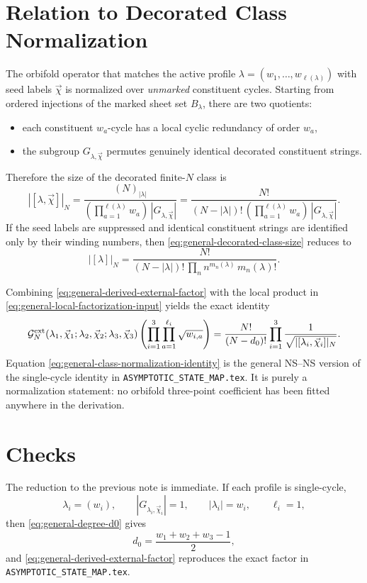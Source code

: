 \documentclass[11pt]{article}
\newcommand{\mc}[1]{\mathcal{#1}}
\begin{document}
\section{Relation to Decorated Class Normalization}
The orbifold operator that matches the active profile $\lambda=(w_1,\dots,w_{\ell(\lambda)})$ with seed labels $\vec\chi$ is normalized over \emph{unmarked} constituent cycles. Starting from ordered injections of the marked sheet set $B_\lambda$, there are two quotients:
\begin{itemize}
\item each constituent $w_a$-cycle has a local cyclic redundancy of order $w_a$,
\item the subgroup $G_{\lambda,\vec\chi}$ permutes genuinely identical decorated constituent strings.
\end{itemize}
Therefore the size of the decorated finite-$N$ class is
\begin{equation}\label{eq:general-decorated-class-size}
|[\lambda,\vec\chi]|_N
=
\frac{(N)_{|\lambda|}}{
\left(\prod_{a=1}^{\ell(\lambda)} w_a\right)\,
|G_{\lambda,\vec\chi}|
}
=
\frac{N!}{
(N-|\lambda|)!\,
\left(\prod_{a=1}^{\ell(\lambda)} w_a\right)\,
|G_{\lambda,\vec\chi}|
}.
\end{equation}
If the seed labels are suppressed and identical constituent strings are identified only by their winding numbers, then \eqref{eq:general-decorated-class-size} reduces to
\begin{equation}\label{eq:general-undecorated-class-size}
|[\lambda]|_N
=
\frac{N!}{
(N-|\lambda|)!\,
\prod_n n^{m_n(\lambda)}\,m_n(\lambda)!
}.
\end{equation}

Combining \eqref{eq:general-derived-external-factor} with the local product in \eqref{eq:general-local-factorization-input} yields the exact identity
\begin{equation}\label{eq:general-class-normalization-identity}
\mc G_N^{\rm ext}(\lambda_1,\vec\chi_1;\lambda_2,\vec\chi_2;\lambda_3,\vec\chi_3)
\left(
\prod_{i=1}^3
\prod_{a=1}^{\ell_i}
\sqrt{w_{i,a}}
\right)
=
\frac{N!}{(N-d_0)!}
\prod_{i=1}^3
\frac{1}{\sqrt{|[\lambda_i,\vec\chi_i]|_N}}.
\end{equation}
Equation \eqref{eq:general-class-normalization-identity} is the general NS--NS version of the single-cycle identity in \texttt{ASYMPTOTIC\_STATE\_MAP.tex}. It is purely a normalization statement: no orbifold three-point coefficient has been fitted anywhere in the derivation.

\section{Checks}
The reduction to the previous note is immediate. If each profile is single-cycle,
\[
\lambda_i=(w_i),
\qquad
|G_{\lambda_i,\vec\chi_i}|=1,
\qquad
|\lambda_i|=w_i,
\qquad
\ell_i=1,
\]
then \eqref{eq:general-degree-d0} gives
\[
d_0=\frac{w_1+w_2+w_3-1}{2},
\]
and \eqref{eq:general-derived-external-factor} reproduces the exact factor in \texttt{ASYMPTOTIC\_STATE\_MAP.tex}.
\end{document}
